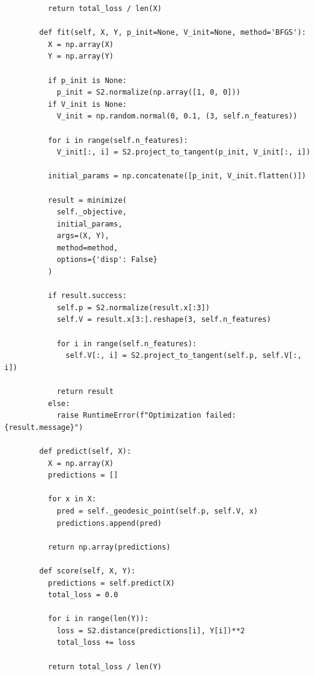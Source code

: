 \begin{example}
\begin{lstlisting}
          return total_loss / len(X)
        
        def fit(self, X, Y, p_init=None, V_init=None, method='BFGS'):
          X = np.array(X)
          Y = np.array(Y)
          
          if p_init is None:
            p_init = S2.normalize(np.array([1, 0, 0]))
          if V_init is None:
            V_init = np.random.normal(0, 0.1, (3, self.n_features))
          
          for i in range(self.n_features):
            V_init[:, i] = S2.project_to_tangent(p_init, V_init[:, i])
          
          initial_params = np.concatenate([p_init, V_init.flatten()])
          
          result = minimize(
            self._objective,
            initial_params,
            args=(X, Y),
            method=method,
            options={'disp': False}
          )
          
          if result.success:
            self.p = S2.normalize(result.x[:3])
            self.V = result.x[3:].reshape(3, self.n_features)
            
            for i in range(self.n_features):
              self.V[:, i] = S2.project_to_tangent(self.p, self.V[:, i])
            
            return result
          else:
            raise RuntimeError(f"Optimization failed: {result.message}")
        
        def predict(self, X):
          X = np.array(X)
          predictions = []
          
          for x in X:
            pred = self._geodesic_point(self.p, self.V, x)
            predictions.append(pred)
          
          return np.array(predictions)
        
        def score(self, X, Y):
          predictions = self.predict(X)
          total_loss = 0.0
          
          for i in range(len(Y)):
            loss = S2.distance(predictions[i], Y[i])**2
            total_loss += loss
          
          return total_loss / len(Y)
    \end{lstlisting}


\end{example}
